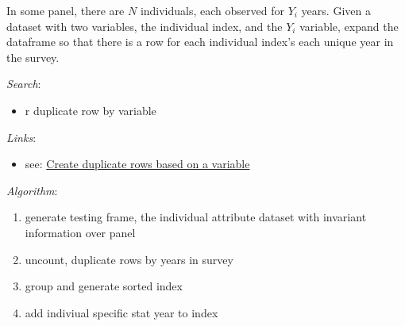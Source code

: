 \documentclass[
]{book}
\providecommand{\tightlist}{%
  \setlength{\itemsep}{0pt}\setlength{\parskip}{0pt}}
\begin{document}
In some panel, there are \(N\) individuals, each observed for \(Y_i\) years. Given a dataset with two variables, the individual index, and the \(Y_i\) variable, expand the dataframe so that there is a row for each individual index's each unique year in the survey.

\emph{Search}:

\begin{itemize}
\tightlist
\item
  r duplicate row by variable
\end{itemize}

\emph{Links}:

\begin{itemize}
\tightlist
\item
  see: \href{https://stackoverflow.com/questions/52498169/r-create-duplicate-rows-based-on-a-variable-dplyr-preferred}{Create duplicate rows based on a variable}
\end{itemize}

\emph{Algorithm}:

\begin{enumerate}
\def\labelenumi{\arabic{enumi}.}
\tightlist
\item
  generate testing frame, the individual attribute dataset with invariant information over panel
\item
  uncount, duplicate rows by years in survey
\item
  group and generate sorted index
\item
  add indiviual specific stat year to index
\end{enumerate}
\end{document}
